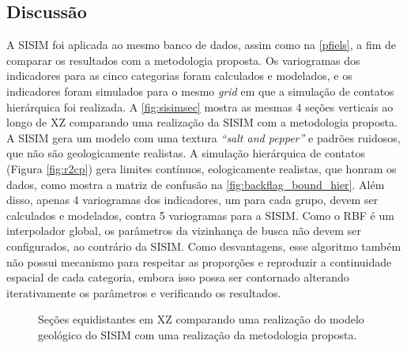 \subsection{Discussão}

A SISIM foi aplicada ao mesmo banco de dados, assim como na \autoref{pfiels}, a fim de comparar os resultados com a metodologia proposta. Os variogramas dos indicadores para as cinco categorias foram calculados e modelados, e os indicadores foram simulados para o mesmo \textit{grid} em que a simulação de contatos hierárquica foi realizada. A \autoref{fig:sisimsec} mostra as mesmas 4 seções verticais ao longo de XZ comparando uma realização da SISIM com a metodologia proposta. A SISIM gera um modelo com uma textura \textit{“salt and pepper”} e padrões ruidosos, que não são geologicamente realistas. A simulação hierárquica de contatos (Figura \autoref{fig:r2cp}) gera limites contínuos, eologicamente realistas, que honram os dados, como mostra a matriz de confusão na \autoref{fig:backflag_bound_hier}. Além disso, apenas 4 variogramas dos indicadores, um para cada grupo, devem ser calculados e modelados, contra 5 variogramas para a SISIM. Como o RBF é um interpolador global, os parâmetros da vizinhança de busca não devem ser configurados, ao contrário da SISIM. Como desvantagens, esse algoritmo também não possui mecanismo para respeitar as proporções e reproduzir a continuidade espacial de cada categoria, embora isso possa ser contornado alterando iterativamente os parâmetros e verificando os resultados.

\begin{figure}[H]
    \caption{Seções equidistantes em XZ comparando uma realização do modelo geológico do SISIM com uma realização da metodologia proposta.} \label{fig:cs_reals}
     \centering
     \hspace{1em}
\end{figure}

